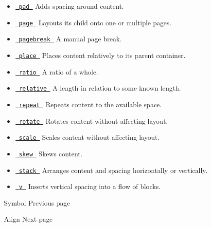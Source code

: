 \begin{itemize}
\item
  \href{/docs/reference/layout/pad/}{\texttt{\ pad\ }} { Adds spacing
  around content. }
\item
  \href{/docs/reference/layout/page/}{\texttt{\ page\ }} { Layouts its
  child onto one or multiple pages. }
\item
  \href{/docs/reference/layout/pagebreak/}{\texttt{\ pagebreak\ }} { A
  manual page break. }
\item
  \href{/docs/reference/layout/place/}{\texttt{\ place\ }} { Places
  content relatively to its parent container. }
\item
  \href{/docs/reference/layout/ratio/}{\texttt{\ ratio\ }} { A ratio of
  a whole. }
\item
  \href{/docs/reference/layout/relative/}{\texttt{\ relative\ }} { A
  length in relation to some known length. }
\item
  \href{/docs/reference/layout/repeat/}{\texttt{\ repeat\ }} { Repeats
  content to the available space. }
\item
  \href{/docs/reference/layout/rotate/}{\texttt{\ rotate\ }} { Rotates
  content without affecting layout. }
\item
  \href{/docs/reference/layout/scale/}{\texttt{\ scale\ }} { Scales
  content without affecting layout. }
\item
  \href{/docs/reference/layout/skew/}{\texttt{\ skew\ }} { Skews
  content. }
\item
  \href{/docs/reference/layout/stack/}{\texttt{\ stack\ }} { Arranges
  content and spacing horizontally or vertically. }
\item
  \href{/docs/reference/layout/v/}{\texttt{\ v\ }} { Inserts vertical
  spacing into a flow of blocks. }
\end{itemize}

\href{/docs/reference/symbols/symbol/}{\pandocbounded{}}

{ Symbol } { Previous page }

\href{/docs/reference/layout/align/}{\pandocbounded{}}

{ Align } { Next page }
